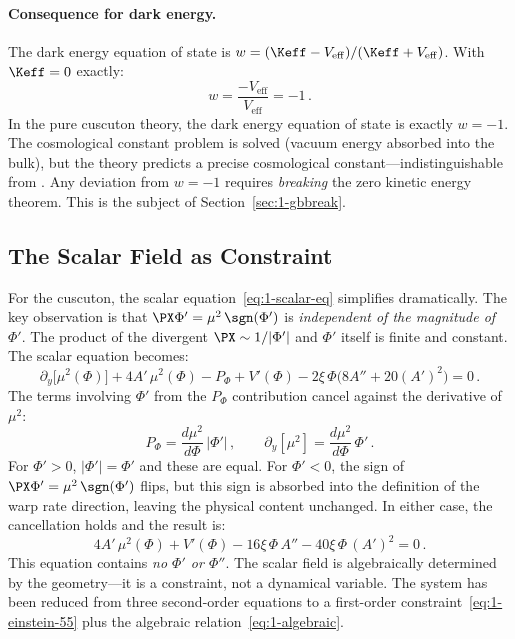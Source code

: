 \paragraph{Consequence for dark energy.} The dark energy equation of state is $w = (\Keff - V_{\mathrm{eff}})/(\Keff + V_{\mathrm{eff}})$. With $\Keff = 0$ exactly:
\begin{equation}
\label{eq:1-w-exact}
w = \frac{-V_{\mathrm{eff}}}{V_{\mathrm{eff}}} = -1\,.
\end{equation}
In the pure cuscuton theory, the dark energy equation of state is exactly $w = -1$. The cosmological constant problem is solved (vacuum energy absorbed into the bulk), but the theory predicts a precise cosmological constant---indistinguishable from \LCDM. Any deviation from $w = -1$ requires \emph{breaking} the zero kinetic energy theorem. This is the subject of Section~\ref{sec:1-gbbreak}.

\subsection{The Scalar Field as Constraint}
\label{sec:1-constraint}

For the cuscuton, the scalar equation~\eqref{eq:1-scalar-eq} simplifies dramatically. The key observation is that $\PX \Phi' = \mu^2\, \sgn(\Phi')$ is \emph{independent of the magnitude of~$\Phi'$}. The product of the divergent $\PX \sim 1/|\Phi'|$ and $\Phi'$ itself is finite and constant. The scalar equation becomes:
\begin{equation}
\label{eq:1-scalar-simplified}
\partial_y\bigl[\mu^2(\Phi)\bigr] + 4A'\, \mu^2(\Phi) - P_\Phi + V'(\Phi) - 2\xi\,\Phi\bigl(8A'' + 20(A')^2\bigr) = 0\,.
\end{equation}
The terms involving $\Phi'$ from the $P_\Phi$ contribution cancel against the derivative of $\mu^2$:
\begin{equation}
P_\Phi = \frac{d\mu^2}{d\Phi}\,|\Phi'|\,, \qquad \partial_y[\mu^2] = \frac{d\mu^2}{d\Phi}\,\Phi'\,.
\end{equation}
For $\Phi' > 0$, $|\Phi'| = \Phi'$ and these are equal. For $\Phi' < 0$, the sign of $\PX \Phi' = \mu^2\, \sgn(\Phi')$ flips, but this sign is absorbed into the definition of the warp rate direction, leaving the physical content unchanged. In either case, the cancellation holds and the result is:
\begin{equation}
\label{eq:1-algebraic}
4A'\, \mu^2(\Phi) + V'(\Phi) - 16\xi\,\Phi\, A'' - 40\xi\,\Phi\,(A')^2 = 0\,.
\end{equation}
This equation contains \emph{no $\Phi'$ or $\Phi''$}. The scalar field is algebraically determined by the geometry---it is a constraint, not a dynamical variable. The system has been reduced from three second-order equations to a first-order constraint~\eqref{eq:1-einstein-55} plus the algebraic relation~\eqref{eq:1-algebraic}.

